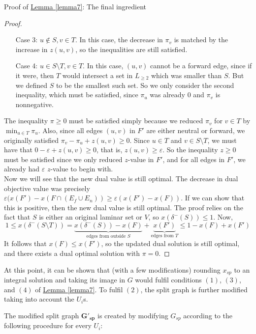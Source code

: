 \documentclass[./main.tex]{subfiles}
\begin{document}
\begin{subsection}{Proof of \hyperref[lemma7]{Lemma \ref{lemma7}}: The final ingredient}
\begin{proof}
\begin{itemize}
		\item[Case 3:] $u\notin S, v\in T$. In this case, the decrease in $\pi_v$ is matched by the increase in $z(u,v)$, so the inequalities are still satisfied.
		\item[Case 4:] $u\in S\setminus T, v\in T$. In this case, $(u,v)$ cannot be a forward edge, since if it were, then $T$ would intersect a set in $L_{\geq 2}$ which was smaller than $S$. But we defined $S$ to be the smallest such set. So we only consider the second inequality, which must be satisfied, since $\pi_u$ was already $0$ and $\pi_v$ is nonnegative.
		\end{itemize}
		The inequality $\pi\geq 0$ must be satisfied simply because we reduced $\pi_v$ for $v\in T$ by $\min_{u\in T}\pi_u$. 
		Also, since all edges $(u,v)$ in $F'$ are either neutral or forward, we originally satisfied $\pi_v - \pi_u + z(u,v)\geq 0$. Since $u\in T$ and $v\in S\setminus T$, we must have that $0 - \varepsilon + z(u,v)\geq 0$, that is, $z(u,v)\geq \varepsilon$. 
So the inequality $z\geq 0$ must be satisfied since we only reduced $z$-value in $F'$, and for all edges in $F'$, we already had $\varepsilon$ $z$-value to begin with.\vspace{2mm}
\\Now we will see that the new dual value is still optimal. 
The decrease in dual objective value was precisely $\varepsilon (x(F') - x(F\cap( E_f\cup E_n))\geq \varepsilon(x(F') - x(F))$. If we can show that this is positive, then the new dual value is still optimal. The proof relies on the fact that $S$ is either an original laminar set or $V$, so $x(\delta^-(S))\leq 1$. Now, $$1\leq x(\delta^-(S\setminus T)) = \underbrace{x(\delta^-(S)) - x(F)}_{\text{edges from outside } S} + \underbrace{x(F')}_{\text{edges from } T}\leq 1 - x(F) + x(F')$$
It follows that $x(F)\leq x(F')$, so the updated dual solution is still optimal, and there exists a dual optimal solution with $\pi = 0$.
	\end{proof}
	At this point, it can be shown that (with a few modifications) rounding $x_{sp}$ to an integral solution and taking its image in $G$ would fulfil conditions $(1)$, $(3)$, and $(4)$ of \hyperref[lemma7]{Lemma \ref{lemma7}}. To fulfil $(2)$, the split graph is further modified taking into account the $U_i$s.\vspace{2mm}
	\begin{definition}
		The modified split graph $\bm{G'_{sp}}$ is created by modifying $G_{sp}$ according to the following procedure for every $U_i$:
		\begin{itemize}[$-$]

\end{itemize}
\end{definition}
\end{subsection}
\end{document}
